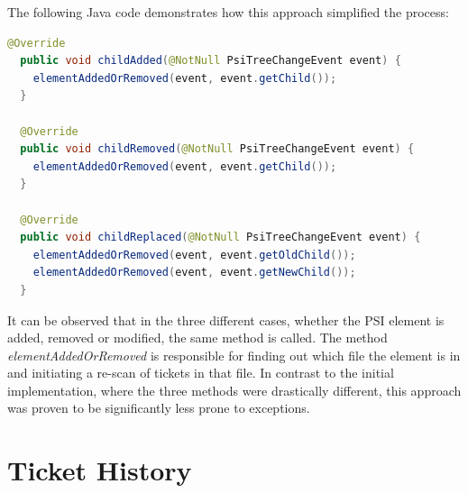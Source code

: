 \documentclass{4thYearProject}
\begin{document}
The following Java code demonstrates how this approach simplified the process:\\

\begin{lstlisting}[language=Java, basicstyle=\footnotesize\tt,        % the size of the fonts that are used for the code
  frame=single,                    % adds a frame around the code
  language=Java,                 % the language of the code
  keywordstyle=\bf]
  @Override
  public void childAdded(@NotNull PsiTreeChangeEvent event) {
  	elementAddedOrRemoved(event, event.getChild());
  }

  @Override
  public void childRemoved(@NotNull PsiTreeChangeEvent event) {
  	elementAddedOrRemoved(event, event.getChild());
  }

  @Override
  public void childReplaced(@NotNull PsiTreeChangeEvent event) {
  	elementAddedOrRemoved(event, event.getOldChild());
  	elementAddedOrRemoved(event, event.getNewChild());
  }

\end{lstlisting}

It can be observed that in the three different cases, whether the PSI element is added, removed or modified, the same method is called. The method \textit{elementAddedOrRemoved} is responsible for finding out which file the element is in and initiating a re-scan of tickets in that file. In contrast to the initial implementation, where the three methods were drastically different, this approach was proven to be significantly less prone to exceptions.  

\section{Ticket History}
\end{document}
